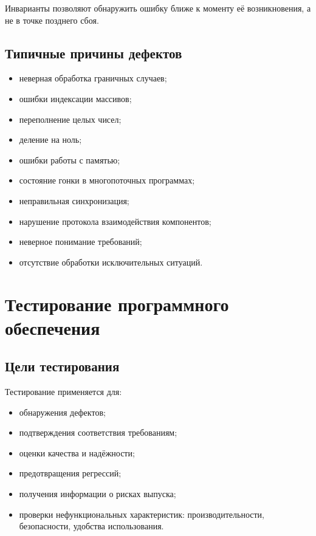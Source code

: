 \documentclass[12pt,a4paper]{article}
\begin{document}
Инварианты позволяют обнаружить ошибку ближе к моменту её возникновения, а не в точке позднего сбоя.

\subsection{Типичные причины дефектов}

\begin{itemize}
    \item неверная обработка граничных случаев;
    \item ошибки индексации массивов;
    \item переполнение целых чисел;
    \item деление на ноль;
    \item ошибки работы с памятью;
    \item состояние гонки в многопоточных программах;
    \item неправильная синхронизация;
    \item нарушение протокола взаимодействия компонентов;
    \item неверное понимание требований;
    \item отсутствие обработки исключительных ситуаций.
\end{itemize}

\section{Тестирование программного обеспечения}

\subsection{Цели тестирования}

Тестирование применяется для:

\begin{itemize}
    \item обнаружения дефектов;
    \item подтверждения соответствия требованиям;
    \item оценки качества и надёжности;
    \item предотвращения регрессий;
    \item получения информации о рисках выпуска;
    \item проверки нефункциональных характеристик: производительности, безопасности, удобства использования.
\end{itemize}
\end{document}
